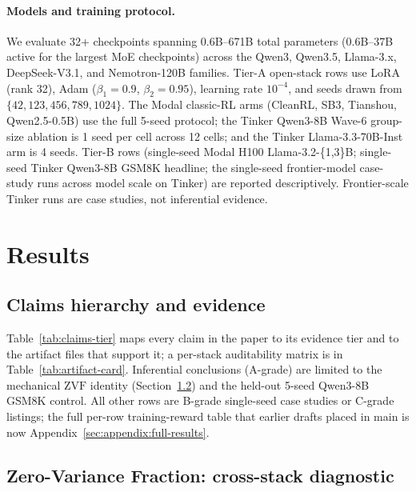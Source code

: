\documentclass{article}
\begin{document}
\paragraph{Models and training protocol.}
We evaluate 32+ checkpoints spanning 0.6B--671B total parameters
(0.6B--37B active for the largest MoE checkpoints) across the Qwen3,
Qwen3.5, Llama-3.x, DeepSeek-V3.1, and Nemotron-120B families.
Tier-A open-stack rows use LoRA (rank 32), Adam ($\beta_1{=}0.9$,
$\beta_2{=}0.95$), learning rate $10^{-4}$, and seeds drawn from
$\{42,123,456,789,1024\}$. The Modal classic-RL arms (CleanRL, SB3,
Tianshou, Qwen2.5-0.5B) use the full 5-seed protocol; the Tinker Qwen3-8B
Wave-6 group-size ablation is 1 seed per cell across 12 cells; and the
Tinker Llama-3.3-70B-Inst arm is 4 seeds. Tier-B rows (single-seed Modal
H100 Llama-3.2-\{1,3\}B; single-seed Tinker Qwen3-8B GSM8K headline; the
single-seed frontier-model case-study runs across model scale on Tinker)
are reported descriptively. Frontier-scale Tinker runs are case studies,
not inferential evidence.

\section{Results}
\label{sec:results}

\subsection{Claims hierarchy and evidence}
\label{sec:main_results}

Table~\ref{tab:claims-tier} maps every claim in the paper to its evidence
tier and to the artifact files that support it; a per-stack auditability
matrix is in Table~\ref{tab:artifact-card}. Inferential conclusions
(A-grade) are limited to the mechanical $\mathrm{ZVF}$ identity
(Section~\ref{sec:zvf-analysis}) and the held-out 5-seed Qwen3-8B GSM8K
control. All other rows are B-grade single-seed case studies or C-grade
listings; the full per-row training-reward table that earlier drafts
placed in main is now Appendix~\ref{sec:appendix:full-results}.




\subsection{Zero-Variance Fraction: cross-stack diagnostic}
\label{sec:zvf-analysis}
\end{document}
